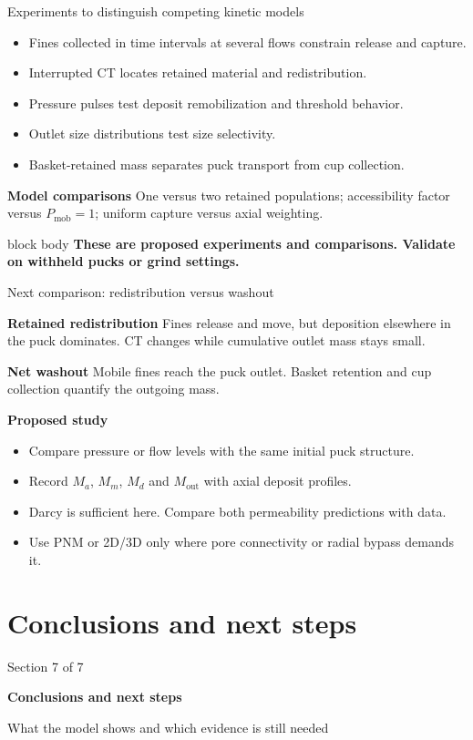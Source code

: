 \documentclass[aspectratio=169,11pt]{beamer}
\newcommand{\hi}[1]{\textcolor{tumblue}{\textbf{#1}}}
\newcommand{\takeaway}[1]{%
  \begin{beamercolorbox}[rounded=true,sep=.55em]{block body}
    \centering\color{tumdark}\textbf{#1}
  \end{beamercolorbox}}
\begin{document}
\begin{frame}{Experiments to distinguish competing kinetic models}
\small

\begin{itemize}
\item Fines collected in time intervals at several flows constrain release and capture.
\item Interrupted CT locates retained material and redistribution.
\item Pressure pulses test deposit remobilization and threshold behavior.
\item Outlet size distributions test size selectivity.
\item Basket-retained mass separates puck transport from cup collection.
\end{itemize}
\medskip
\hi{Model comparisons}
\small One versus two retained populations; accessibility factor versus $P_{\mathrm{mob}}=1$; uniform capture versus axial weighting.
\vfill
\takeaway{These are proposed experiments and comparisons. Validate on withheld pucks or grind settings.}

\end{frame}

\begin{frame}{Next comparison: redistribution versus washout}
\small

\hi{Retained redistribution}
\small Fines release and move, but deposition elsewhere in the puck dominates. CT changes while cumulative outlet mass stays small.
\par\medskip
\hi{Net washout}
\small Mobile fines reach the puck outlet. Basket retention and cup collection quantify the outgoing mass.
\par\medskip
\hi{Proposed study}
\begin{itemize}
\item Compare pressure or flow levels with the same initial puck structure.
\item Record $M_a$, $M_m$, $M_d$ and $M_{\mathrm{out}}$ with axial deposit profiles.
\item Darcy is sufficient here. Compare both permeability predictions with data.
\item Use PNM or 2D/3D only where pore connectivity or radial bypass demands it.
\end{itemize}

\end{frame}

\section[Conclusions]{Conclusions and next steps}
\begin{frame}{}
\vfill
{\large\color{tumgray}Section 7 of 7}\par\vspace{0.4cm}
{\LARGE\color{tumblue}\textbf{Conclusions and next steps}}\par\vspace{0.5cm}
{\large What the model shows and which evidence is still needed}
\vfill
\end{frame}
\end{document}
